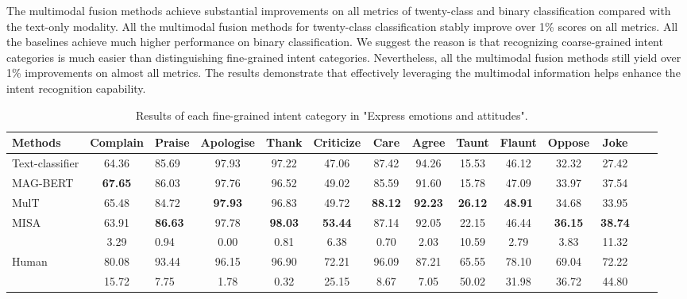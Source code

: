 \documentclass[sigconf,camera-ready]{acmart}
\begin{document}
The multimodal fusion methods achieve substantial improvements on all metrics of twenty-class and binary classification compared with the text-only modality. All the multimodal fusion methods for twenty-class classification stably improve over 1\% scores on all metrics. All the baselines achieve much higher performance on binary classification. We suggest the reason is that recognizing coarse-grained intent categories is much easier than distinguishing fine-grained intent categories. Nevertheless, all the multimodal fusion methods still yield over 1\% improvements on almost all metrics. The results demonstrate that effectively leveraging the multimodal information helps enhance the intent recognition capability. 
\begin{table*}[t!]\small
	\caption{\label{emotion_results_each_class} Results of each fine-grained intent category in "Express emotions and attitudes".}
	\renewcommand\tabcolsep{3pt} 
	\centering
	
	\begin{tabular*}{\textwidth}{l|c@{\extracolsep{\fill}}lccccccccccc} 
		\toprule
Methods &Complain& Praise & Apologise & Thank & Criticize  & Care & Agree & Taunt & Flaunt & Oppose & Joke   \\ 
		\midrule
		\multicolumn{1}{l|}{Text-classifier}  & 64.36 & 85.69 & 97.93 & 97.22 & 47.06 & 87.42 & 94.26 & 15.53 & 46.12 & 32.32 & 27.42 \\
		\midrule
		\multicolumn{1}{l|}{MAG-BERT}  & \textbf{67.65} & 86.03 & 97.76 & 96.52 & 49.02 & 85.59 & 91.60 & 15.78 & 47.09 & 33.97 & 37.54\\
		\multicolumn{1}{l|}{MulT} & 65.48 & 84.72 & \textbf{97.93} & 96.83 & 49.72 & \textbf{88.12} & \textbf{92.23} & \textbf{26.12} & \textbf{48.91} & 34.68 & 33.95 \\
		\multicolumn{1}{l|}{MISA} & 63.91 & \textbf{86.63} & 97.78 & \textbf{98.03} & \textbf{53.44} & 87.14 & 92.05 & 22.15 & 46.44 & \textbf{36.15} & \textbf{38.74}\\
		\multicolumn{1}{l|}{} &3.29 & 0.94 & 0.00 & 0.81 & 6.38 & 0.70 & 2.03 & 10.59 & 2.79 & 3.83 & 11.32 \\
        \midrule
		\multicolumn{1}{l|}{Human}  & 80.08 & 93.44 & 96.15 & 96.90 & 72.21 & 96.09 & 87.21 & 65.55 & 78.10 & 69.04 & 72.22 \\
		\multicolumn{1}{l|}{}  & 15.72 & 7.75 & 1.78 & 0.32 & 25.15 & 8.67 & 7.05 & 50.02 & 31.98 & 36.72 & 44.80 \\
		\midrule
	\end{tabular*}
\end{table*}
\end{document}
